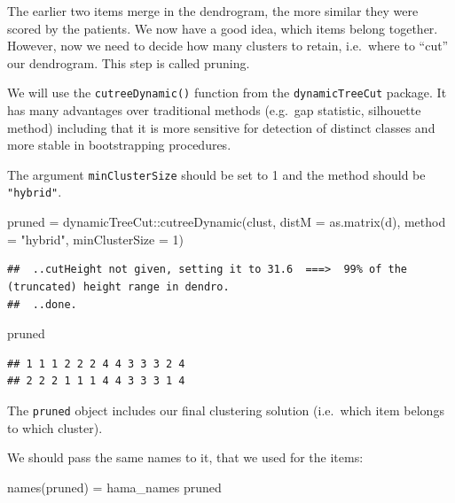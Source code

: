 \documentclass[
]{book}
\newenvironment{Shaded}{\begin{snugshade}}{\end{snugshade}}
\newcommand{\AttributeTok}[1]{\textcolor[rgb]{0.77,0.63,0.00}{#1}}
\newcommand{\DecValTok}[1]{\textcolor[rgb]{0.00,0.00,0.81}{#1}}
\newcommand{\FunctionTok}[1]{\textcolor[rgb]{0.00,0.00,0.00}{#1}}
\newcommand{\NormalTok}[1]{#1}
\newcommand{\OtherTok}[1]{\textcolor[rgb]{0.56,0.35,0.01}{#1}}
\newcommand{\SpecialCharTok}[1]{\textcolor[rgb]{0.00,0.00,0.00}{#1}}
\newcommand{\StringTok}[1]{\textcolor[rgb]{0.31,0.60,0.02}{#1}}
\begin{document}
The earlier two items merge in the dendrogram, the more similar they were scored by the patients. We now have a good idea, which items belong together. However, now we need to decide how many clusters to retain, i.e.~where to ``cut'' our dendrogram. This step is called pruning.

We will use the \texttt{cutreeDynamic()} function from the \texttt{dynamicTreeCut} package. It has many advantages over traditional methods (e.g.~gap statistic, silhouette method) including that it is more sensitive for detection of distinct classes and more stable in bootstrapping procedures.

The argument \texttt{minClusterSize} should be set to 1 and the method should be \texttt{"hybrid"}.

\begin{Shaded}
\begin{Highlighting}[]
\NormalTok{pruned }\OtherTok{=}\NormalTok{ dynamicTreeCut}\SpecialCharTok{::}\FunctionTok{cutreeDynamic}\NormalTok{(clust, }\AttributeTok{distM =} \FunctionTok{as.matrix}\NormalTok{(d), }\AttributeTok{method =} \StringTok{"hybrid"}\NormalTok{, }\AttributeTok{minClusterSize =} \DecValTok{1}\NormalTok{)}
\end{Highlighting}
\end{Shaded}

\begin{verbatim}
##  ..cutHeight not given, setting it to 31.6  ===>  99% of the (truncated) height range in dendro.
##  ..done.
\end{verbatim}

\begin{Shaded}
\begin{Highlighting}[]
\NormalTok{pruned}
\end{Highlighting}
\end{Shaded}

\begin{verbatim}
## 1 1 1 2 2 2 4 4 3 3 3 2 4 
## 2 2 2 1 1 1 4 4 3 3 3 1 4
\end{verbatim}

The \texttt{pruned} object includes our final clustering solution (i.e.~which item belongs to which cluster).

We should pass the same names to it, that we used for the items:

\begin{Shaded}
\begin{Highlighting}[]
\FunctionTok{names}\NormalTok{(pruned) }\OtherTok{=}\NormalTok{ hama\_names}
\NormalTok{pruned}
\end{Highlighting}
\end{Shaded}
\end{document}
